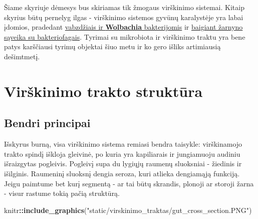 \documentclass[]{book}
\newenvironment{Shaded}{\begin{snugshade}}{\end{snugshade}}
\newcommand{\KeywordTok}[1]{\textcolor[rgb]{0.13,0.29,0.53}{\textbf{#1}}}
\newcommand{\NormalTok}[1]{#1}
\newcommand{\OperatorTok}[1]{\textcolor[rgb]{0.81,0.36,0.00}{\textbf{#1}}}
\newcommand{\StringTok}[1]{\textcolor[rgb]{0.31,0.60,0.02}{#1}}
\begin{document}
Šiame skyriuje dėmesys bus skiriamas tik žmogaus virškinimo sistemai. Kitaip skyrius būtų pernelyg ilgas - virškinimo sistemos gyvūnų karalystėje yra labai įdomios, pradedant \href{https://www.ncbi.nlm.nih.gov/pmc/articles/PMC3873267/}{vabzdžiais ir \textbf{Wolbachia} bakterijomis} ir \href{https://www.ncbi.nlm.nih.gov/pmc/articles/PMC5553654/}{baigiant žarnyno sąveika su bakteriofagais}. Tyrimai su mikrobiota ir virškinimo traktu yra bene patys karščiausi tyrimų objektai šiuo metu ir ko gero išliks artimiausią dešimtmetį.

\hypertarget{virskinimo-trakto-struktura}{%
\section{Virškinimo trakto struktūra}\label{virskinimo-trakto-struktura}}

\hypertarget{bendri-principai}{%
\subsection{Bendri principai}\label{bendri-principai}}

Išskyrus burną, visa virškinimo sistema remiasi bendra taisykle: virškinamojo trakto spindį iškloja gleivinė, po kuria yra kapiliarais ir jungiamuoju audiniu išraizgytas pogleivis. Pogleivį supa du lygiųjų raumenų sluoksniai - žiedinis ir išilginis. Raumeninį sluoksnį dengia seroza, kuri atlieka dengiamąją funkciją. Jeigu paimtume bet kurį segmentą - ar tai būtų skrandis, plonoji ar storoji žarna - visur rastume tokią pačią struktūrą.

\begin{Shaded}
\begin{Highlighting}[]
\NormalTok{knitr}\OperatorTok{::}\KeywordTok{include_graphics}\NormalTok{(}\StringTok{"static/virskinimo_traktas/gut_cross_section.PNG"}\NormalTok{)}
\end{Highlighting}
\end{Shaded}
\end{document}

